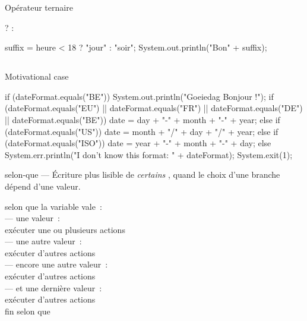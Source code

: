 \begin{frame}[fragile]{Opérateur ternaire}
\begin{grammaire}
     ?  : 
\end{grammaire}
\vfill
\pause
\begin{java}
suffix = heure < 18 ? "jour" : "soir";
System.out.println("Bon" + suffix);
\end{java}
\end{frame}

\subsection{}
\begin{frame}[fragile]{Motivational case}
\begin{java}
if (dateFormat.equals("BE"))
    System.out.println("Goeiedag Bonjour !");
if (dateFormat.equals("EU") || dateFormat.equals("FR")
        || dateFormat.equals("DE")
        || dateFormat.equals("BE")) {
    date = day + "-" + month + "-" + year;
} else if (dateFormat.equals("US")) {
    date = month + "/" + day + "/" + year;
} else if (dateFormat.equals("ISO")) {
    date = year + "-" + month + "-" + day;
} else {
    System.err.println("I don't know this format: "
            + dateFormat);
    System.exit(1);
}
\end{java}
\end{frame}

\begin{frame}{selon-que --- }
  Écriture plus lisible de \emph{certains} , quand le
  choix d’une branche dépend d'une valeur.

  \begin{langagenaturel}
    selon que la variable vale~:\\
      \tab — une valeur~:\\
        \tab\tab exécuter une ou plusieurs actions\\
      \tab — une autre valeur~:\\
        \tab\tab exécuter d'autres actions\\
      \tab — encore une autre valeur~:\\
        \tab\tab exécuter d'autres actions\\
      \tab — et une dernière valeur~:\\
        \tab\tab exécuter d'autres actions\\
    fin selon que
  \end{langagenaturel}
\end{frame}

